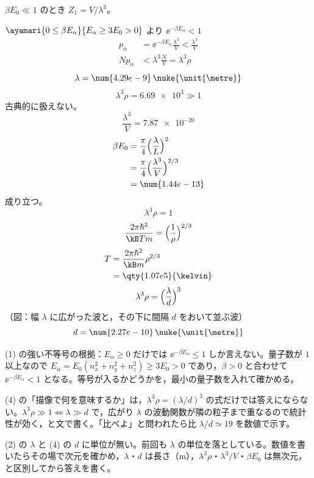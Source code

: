 $\beta E_0\ll1$ のとき $Z_1=V/\lambda^{3}$。

$\ayamari{0\le\beta E_\alpha}{E_\alpha\ge3E_0>0}$ より $\ee^{-\beta E_\alpha}<1$
\begin{align*}
p_\alpha&=\ee^{-\beta E_\alpha}\frac{\lambda^{3}}{V}<\frac{\lambda^{3}}{V}\\
Np_\alpha&<\lambda^{3}\frac{N}{V}=\lambda^{3}\rho
\end{align*}
\[ \lambda=\num{4.29e-9}\,\nuke{\unit{\metre}} \]
\[ \lambda^{3}\rho=\num{6.69e3}\gg1 \]
古典的に扱えない。
\[ \frac{\lambda^{3}}{V}=\num{7.87e-20} \]
\begin{align*}
\beta E_0&=\frac{\pi}{4}\Bigl(\frac{\lambda}{L}\Bigr)^{2}\\
&=\frac{\pi}{4}\Bigl(\frac{\lambda^{3}}{V}\Bigr)^{2/3}\\
&=\num{1.44e-13}
\end{align*}
成り立つ。
\[ \lambda^{3}\rho=1 \]
\[ \frac{2\pi\hbar^{2}}{\kB Tm}=\Bigl(\frac{1}{\rho}\Bigr)^{2/3} \]
\begin{align*}
T&=\frac{2\pi\hbar^{2}}{\kB m}\rho^{2/3}\\
&=\qty{1.07e5}{\kelvin}
\end{align*}
\[ \lambda^{3}\rho=\Bigl(\frac{\lambda}{d}\Bigr)^{3} \]
（図：幅 $\lambda$ に広がった波と，その下に間隔 $d$ をおいて並ぶ波）
\[ d=\num{2.27e-10}\,\nuke{\unit{\metre}} \]
\item (1) の強い不等号の根拠：$E_\alpha\ge0$ だけでは $\ee^{-\beta E_\alpha}\le1$ しか言えない。量子数が $1$ 以上なので $E_\alpha=E_0(n_x^{2}+n_y^{2}+n_z^{2})\ge3E_0>0$ であり，$\beta>0$ と合わせて $\ee^{-\beta E_\alpha}<1$ となる。等号が入るかどうかを，最小の量子数を入れて確かめる。
\item (4) の「描像で何を意味するか」は，$\lambda^{3}\rho=(\lambda/d)^{3}$ の式だけでは答えにならない。$\lambda^{3}\rho\gg1\iff\lambda\gg d$ で，広がり $\lambda$ の波動関数が隣の粒子まで重なるので統計性が効く，と文で書く。「比べよ」と問われたら比 $\lambda/d\simeq19$ を数値で示す。
\item {} (2) の $\lambda$ と (4) の $d$ に単位が無い。前回も $\lambda$ の単位を落としている。数値を書いたらその場で次元を確かめ，$\lambda$・$d$ は長さ（$\unit{\metre}$），$\lambda^{3}\rho$・$\lambda^{3}/V$・$\beta E_0$ は無次元，と区別してから答えを書く。

